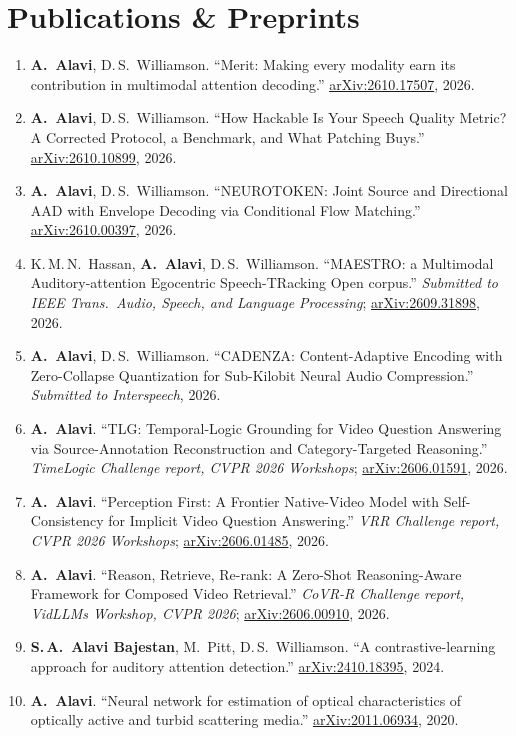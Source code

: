 \documentclass[10pt,letterpaper]{article}
\newcommand{\me}{\textbf{A.~Alavi}}
\newcommand{\arxiv}[1]{\href{https://arxiv.org/abs/#1}{\color{accent}arXiv:#1}}
\newcommand{\venue}[1]{{\color{muted}\textit{#1}}}
\begin{document}
\section{Publications \& Preprints}
\begin{enumerate}
  \item \me, D.\,S.\ Williamson. ``Merit: Making every modality earn its contribution in multimodal attention
    decoding.'' \arxiv{2610.17507}, 2026.
  \item \me, D.\,S.\ Williamson. ``How Hackable Is Your Speech Quality Metric? A Corrected Protocol, a Benchmark,
    and What Patching Buys.'' \arxiv{2610.10899}, 2026.
  \item \me, D.\,S.\ Williamson. ``NEUROTOKEN: Joint Source and Directional AAD with Envelope Decoding via
    Conditional Flow Matching.'' \arxiv{2610.00397}, 2026.
  \item K.\,M.\,N.\ Hassan, \me, D.\,S.\ Williamson. ``MAESTRO: a Multimodal Auditory-attention Egocentric
    Speech-TRacking Open corpus.'' \venue{Submitted to IEEE Trans.\ Audio, Speech, and Language Processing};
    \arxiv{2609.31898}, 2026.
  \item \me, D.\,S.\ Williamson. ``CADENZA: Content-Adaptive Encoding with Zero-Collapse Quantization for
    Sub-Kilobit Neural Audio Compression.'' \venue{Submitted to Interspeech}, 2026.
  \item \me. ``TLG: Temporal-Logic Grounding for Video Question Answering via Source-Annotation Reconstruction
    and Category-Targeted Reasoning.'' \venue{TimeLogic Challenge report, CVPR 2026 Workshops}; \arxiv{2606.01591}, 2026.
  \item \me. ``Perception First: A Frontier Native-Video Model with Self-Consistency for Implicit Video Question
    Answering.'' \venue{VRR Challenge report, CVPR 2026 Workshops}; \arxiv{2606.01485}, 2026.
  \item \me. ``Reason, Retrieve, Re-rank: A Zero-Shot Reasoning-Aware Framework for Composed Video Retrieval.''
    \venue{CoVR-R Challenge report, VidLLMs Workshop, CVPR 2026}; \arxiv{2606.00910}, 2026.
  \item \textbf{S.\,A.\ Alavi Bajestan}, M.\ Pitt, D.\,S.\ Williamson. ``A contrastive-learning approach for
    auditory attention detection.'' \arxiv{2410.18395}, 2024.
  \item \me. ``Neural network for estimation of optical characteristics of optically active and turbid
    scattering media.'' \arxiv{2011.06934}, 2020.
\end{enumerate}
\end{document}
